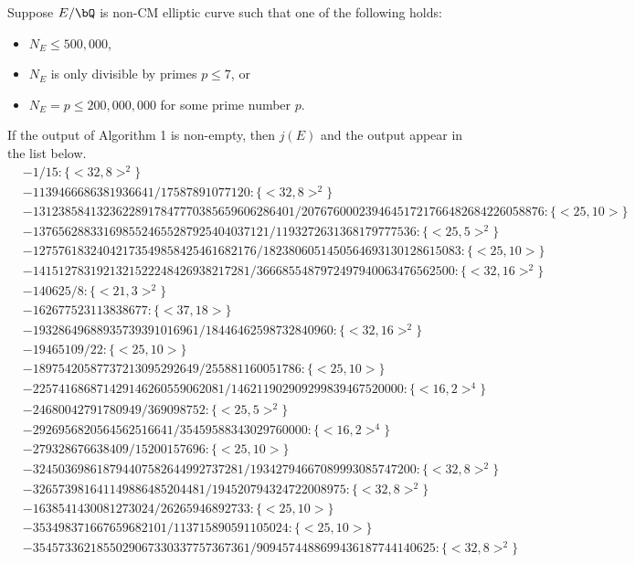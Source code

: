 \documentclass[11pt,reqno]{amsart}
\theoremstyle{plain}
\theoremstyle{definition}
\newcommand{\Q}{\bQ}
\begin{document}
Suppose $E/\Q$ is non-CM elliptic curve such that one of the following holds:
\begin{itemize}
    \item$N_E \leq 500{,}000$,
    \item $N_E$ is only divisible by primes $p \leq 7$, or
    \item $N_E=p \leq 200{,}000{,}000$ for some prime number $p$.
\end{itemize}
If the output of Algorithm 1 is non-empty, then $j(E)$ and the output appear in the list below.
\scriptsize{
\begin{align*}
&-1/15:\{<32, 8>^2\}\\
&-1139466686381936641/17587891077120:\{<32, 8>^2 \}\\
&-13123858413236228917847770385659606286401/20767600023946451721766482684226058876:\{ <25, 10> \}\\
&-1376562883316985524655287925404037121/1193272631368179777536:\{ <25, 5>^2 \}\\
&-12757618324042173549858425461682176/1823806051450564693130128615083:\{ <25, 10> \}\\
&-1415127831921321522248426938217281/3666855487972497940063476562500:\{ <32, 16>^2 \}\\
&-140625/8:\{ <21, 3>^2 \}\\
&-162677523113838677:\{ <37, 18> \}\\
&-19328649688935739391016961/18446462598732840960:\{ <32, 16>^2 \}\\
&-19465109/22:\{ <25, 10> \}\\
&-18975420587737213095292649/255881160051786:\{<25, 10> \}\\
&-225741686871429146260559062081/146211902909299839467520000:\{ <16, 2>^4 \}\\
&-24680042791780949/369098752:\{ <25, 5>^2 \}\\
&-2926956820564562516641/35459588343029760000:\{ <16, 2>^4 \}\\
&-279328676638409/15200157696:\{ <25, 10> \}\\
&-324503698618794407582644992737281/19342794667089993085747200:\{ <32, 8>^2 \}\\
&-326573981641149886485204481/194520794324722008975:\{ <32, 8>^2 \}\\
&-1638541430081273024/26265946892733:\{ <25, 10> \}\\
&-353498371667659682101/113715890591105024:\{ <25, 10> \}\\
&-3545733621855029067330337757367361/9094574488699436187744140625:\{ <32, 8>^2 \}\\

\end{align*}}
\end{document}
